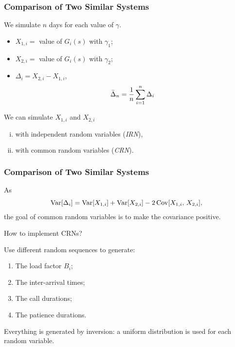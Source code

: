 \documentclass[t,usepdftitle=false,aspectratio=169]{beamer}
\begin{document}
\begin{frame}
	\frametitle{Comparison of Two Similar Systems}
	
	We simulate \(n\) days for each value of \(\gamma\).
	\begin{itemize}
		\item
		${X_{1,i}}=$ value of \(G_i(s)\) with \(\gamma_1\);
		\item
		${X_{2,i}}=$ value of \(G_i(s)\) with \(\gamma_2\);
		\item
		${\Delta_i} = X_{2,i}-X_{1,i}$,
		\[
		{\bar\Delta_n} = {1\over n} \sum_{i=1}^n \Delta_i
		\]
	\end{itemize}
	
	\mbox{}
	
	We can simulate \(X_{1,i}\) and \(X_{2,i}\)
	\begin{enumerate}[(i)]
		\item with independent random variables (\emph{IRN}),
		\item with common random variables (\emph{CRN}).
	\end{enumerate}
	
\end{frame}

\begin{frame}
	\frametitle{Comparison of Two Similar Systems}
	
	As
	\[
	\operatorname{Var}[\Delta_i] = \operatorname{Var}[X_{1,i}] + \operatorname{Var}[X_{2,i}] - 2\operatorname{Cov}[X_{1,i},\,X_{2,i}],
	\]
	the goal of common random variables is to make the covariance positive.
	
	\mbox{}
	
	How to implement CRNs?
	
	\mbox{}
	
	Use different random sequences to generate:
	\begin{enumerate}
		\item The load factor \(B_i\);
		\item The inter-arrival times;
		\item The call durations;
		\item The patience durations.
	\end{enumerate}
	Everything is generated by inversion: a uniform distribution is used for each random variable.
	
\end{frame}
\end{document}
